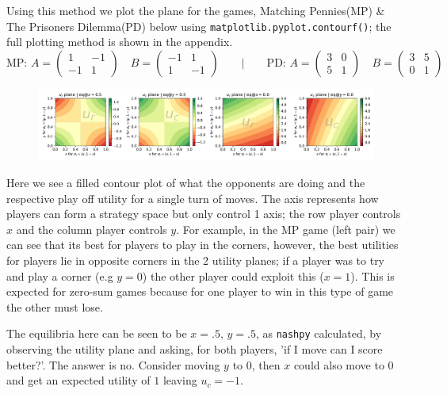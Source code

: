 \documentclass[9pt]{report}
\begin{document}
    Using this method we plot the plane for the games, Matching Pennies(MP) \& The Prisoners Dilemma(PD) below using \texttt{matplotlib.pyplot.contourf()}; the full plotting method is shown in the appendix.
    \begingroup\makeatletter\def\f@size{8}\check@mathfonts
    $$  \text{MP:  }
            A=\begin{pmatrix}1 & -1 \\ -1 & 1\end{pmatrix}\quad
            B=\begin{pmatrix}-1 & 1 \\ 1 & -1\end{pmatrix}\qquad\vert\qquad
        \text{PD: }
            A=\begin{pmatrix}3 & 0 \\ 5 & 1\end{pmatrix}\quad
            B=\begin{pmatrix}3 & 5 \\ 0 & 1\end{pmatrix}$$
    \begin{figure}[ht]
        \includegraphics[width=1.0\textwidth, center]{./img/f1.pdf}
    \end{figure}
    \endgroup
    Here we see a filled contour plot of what the opponents are doing and the respective play off utility for a single turn of moves. The axis represents how players can form a strategy space but only control 1 axis; the row player controls $x$ and the column player controls $y$. For example, in the MP game (left pair) we can see that its best for players to play in the corners, however, the best utilities for players lie in opposite corners in the 2 utility planes; if a player was to try and play a corner (e.g $y=0$) the other player could exploit this ($x=1$). This is expected for zero-sum games because for one player to win in this type of game the other must lose. 

    The equilibria here can be seen to be $x=.5, \, y=.5$, as \texttt{nashpy} calculated, by observing the utility plane and asking, for both players, 'if I move can I score better?'. The answer is no. Consider moving $y$ to $0$, then $x$ could also move to $0$ and get an expected utility of $1$ leaving $u_c=-1$.
    
\end{document}
